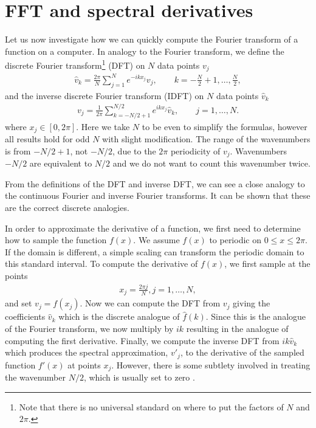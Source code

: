\section{FFT and spectral derivatives} 
Let us now investigate how we can quickly compute the Fourier transform of a function on a computer. In analogy to the Fourier transform, we define \cite{trefethen_spectral} the discrete Fourier transform\footnote{Note that there is no universal standard on where to put the factors of $N$ and $2\pi$.} (DFT) on $N$ data points $v_{j}$
\begin{align}
\hat{v}_{k} = \frac{2\pi}{N}\sum_{j=1}^{N} e^{-ikx_{j}}v_{j},\qquad k=-\frac{N}{2}+1,\ldots,\frac{N}{2},\label{dft}
\end{align}
and the inverse discrete Fourier transform (IDFT)  on $N$ data points $\hat{v}_{k}$
\begin{align}
v_{j} = \frac{1}{2\pi}\sum_{k=-N/2+1}^{N/2} e^{ikx_{j}}\hat{v}_{k}, \qquad j=1,\ldots, N.\label{idft}
\end{align}
where $x_{j}\in[0,2\pi]$. Here we take $N$ to be even to simplify the formulas, however all results hold for odd $N$ with slight modification. The range of the wavenumbers is from $-N/2+1$, not $-N/2$, due to the $2\pi$ periodicity of $v_{j}$. Wavenumbers $-N/2$ are equivalent to $N/2$ and we do not want to count this wavenumber twice. 


From the definitions of the DFT and inverse DFT, we can see a close analogy to the continuous Fourier and inverse Fourier transforms. It can be shown \cite{trefethen_spectral} that these are the correct discrete analogies. 

In order to approximate the derivative of a function, we first need to determine how to sample the function $f(x)$. We assume $f(x)$ to periodic on $0\le x\le 2\pi$. If the domain is different, a simple scaling can transform the periodic domain to this standard interval. To compute the derivative of $f(x)$, we first sample at the points 
\begin{align}
x_{j} = \frac{2\pi j}{N}, j=1,\ldots,N,
\end{align}
and set $v_{j}=f(x_{j})$. Now we can compute the DFT from $v_{j}$ giving the coefficients $\hat{v}_{k}$ which is the discrete analogue of $\hat{f}(k)$.  Since this is the analogue of the Fourier transform, we now multiply by $ik$ resulting in the analogue of computing the first derivative. Finally, we compute the inverse DFT from $ik\hat{v}_{k}$ which produces the spectral approximation, $v'_{j}$, to the derivative of the sampled function $f'(x)$ at points $x_{j}$. However, there is some subtlety involved in treating the wavenumber $N/2$, which is usually set to zero \cite{trefethen_spectral}.

